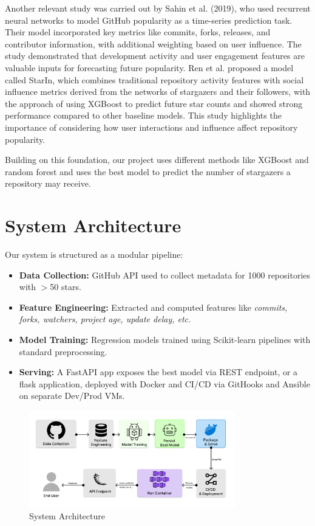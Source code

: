 \documentclass[12pt,a4paper]{article}
\begin{document}
Another relevant study was carried out by Sahin et al. (2019),\cite{4} who used recurrent neural networks to model GitHub popularity as a time-series prediction task. Their model incorporated key metrics like commits, forks, releases, and contributor information, with additional weighting based on user influence. The study demonstrated that development activity and user engagement features are valuable inputs for forecasting future popularity. Ren et al.\cite{2} proposed a model called StarIn, which combines traditional repository activity features with social influence metrics derived from the networks of stargazers and their followers, with the approach of using XGBoost to predict future star counts and showed strong performance compared to other baseline models. This study highlights the importance of considering how user interactions and influence affect repository popularity.

Building on this foundation, our project uses different methods like XGBoost and random forest and uses the best model to predict the number of stargazers a repository may receive. 

\section{System Architecture}
Our system is structured as a modular pipeline:
\begin{itemize}
    \item \textbf{Data Collection:} GitHub API used to collect metadata for 1000 repositories with $>$50 stars.
    \item \textbf{Feature Engineering:} Extracted and computed features like \textit{commits, forks, watchers, project age, update delay, etc.}
    \item \textbf{Model Training:} Regression models trained using Scikit-learn pipelines with standard preprocessing.
    \item \textbf{Serving:} A FastAPI app exposes the best model via REST endpoint, or a flask application, deployed with Docker and CI/CD via GitHooks and Ansible on separate Dev/Prod VMs.
\end{itemize}

\begin{figure}[H]
  \centering
  \includegraphics[width=0.8\textwidth]{Architecture.png}
  \caption{System Architecture}
  \label{fig:my-image}
\end{figure}
\end{document}

